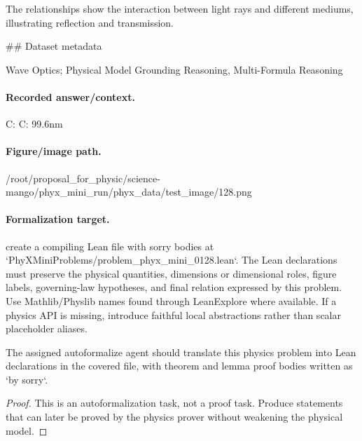 The relationships show the interaction between light rays and different mediums, illustrating reflection and transmission.

\#\# Dataset metadata

Wave Optics; Physical Model Grounding Reasoning, Multi-Formula Reasoning

\paragraph{Recorded answer/context.}
C: C: 99.6nm

\paragraph{Figure/image path.}
/root/proposal\_for\_physic/science-mango/phyx\_mini\_run/phyx\_data/test\_image/128.png

\paragraph{Formalization target.}
create a compiling Lean file with sorry bodies at `PhyXMiniProblems/problem\_phyx\_mini\_0128.lean`. The Lean declarations must preserve the physical quantities, dimensions or dimensional roles, figure labels, governing-law hypotheses, and final relation expressed by this problem.
Use Mathlib/Physlib names found through LeanExplore where available. If a physics API is missing, introduce faithful local abstractions rather than scalar placeholder aliases.

\begin{theorem}
\label{thm:physics:phyx_mini_0128:target}
The assigned autoformalize agent should translate this physics problem into Lean declarations in the covered file, with theorem and lemma proof bodies written as `by sorry`.
\end{theorem}
\begin{proof}
This is an autoformalization task, not a proof task. Produce statements that can later be proved by the physics prover without weakening the physical model.
\end{proof}

